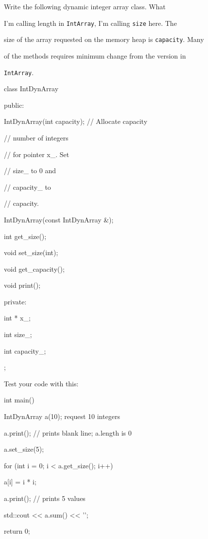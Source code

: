Write the following dynamic integer array class. What

I'm calling length in \texttt{IntArray}, I'm calling \texttt{size} here. The

size of the array requested on the memory heap is \texttt{capacity}. Many

of the methods requires minimum change from the version in

\texttt{IntArray}.



\begin{consolethree}[escapeinside=||]

class IntDynArray

{

public:

    IntDynArray(int capacity); // Allocate capacity

                               // number of integers

                               // for pointer x_. Set

                               // size_ to 0 and

                               // capacity_ to

                               // capacity.

    IntDynArray(const IntDynArray &);

    int get_size();

    void set_size(int);

    void get_capacity();

    void print();

private:

    int * x_;

    int size_;

    int capacity_;

};

\end{consolethree}



Test your code with this:



\begin{consolethree}[escapeinside=||]

int main()

{

    IntDynArray a(10); request 10 integers

    a.print(); // prints blank line; a.length is 0

    a.set_size(5);

    for (int i = 0; i < a.get_size(); i++)

    {

        a[i] = i * i;

    }

    a.print(); // prints 5 values

    std::cout << a.sum() << '\n';

    return 0;

}

\end{consolethree}



